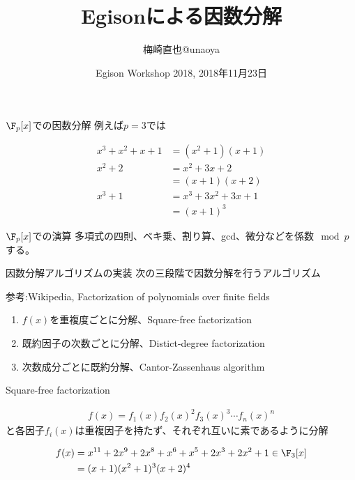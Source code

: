 \documentclass[uplatex]{beamer}
\title{Egisonによる因数分解}
\author{梅崎直也@unaoya}
\date{Egison Workshop 2018, 2018年11月23日}
\institute{株式会社すうがくぶんか}
\begin{document}
\begin{frame}
\maketitle
\end{frame}

\begin{frame}{$\F_p[x]$での因数分解}
例えば$p=3$では

\begin{align*}
x^3+x^2+x+1&=(x^2+1)(x+1)\\
x^2+2&=x^2+3x+2\\&=(x+1)(x+2)\\
x^3+1&=x^3+3x^2+3x+1\\&=(x+1)^3
\end{align*}
\end{frame}

\begin{frame}{$\F_p[x]$での演算}
多項式の四則、ベキ乗、割り算、gcd、微分などを係数$\mod p$する。
\end{frame}

\begin{frame}{因数分解アルゴリズムの実装}
次の三段階で因数分解を行うアルゴリズム

参考:Wikipedia, Factorization of polynomials over finite fields

\begin{enumerate}
\item $f(x)$を重複度ごとに分解、Square-free factorization
\item 既約因子の次数ごとに分解、Distict-degree factorization
\item 次数成分ごとに既約分解、Cantor-Zassenhaus algorithm
\end{enumerate}
\end{frame}

\begin{frame}{Square-free factorization}

\begin{align*}
f(x)=f_1(x)f_2(x)^2f_3(x)^3\cdots f_n(x)^n
\end{align*}
と各因子$f_i(x)$は重複因子を持たず、それぞれ互いに素であるように分解


\begin{align*}
f(x)&=x^{11}+2x^9+2x^8+x^6+x^5+2x^3+2x^2+1 \in \F_3[x]\\
&=(x+1)(x^2+1)^3(x+2)^4
\end{align*}
\end{frame}
\end{document}
